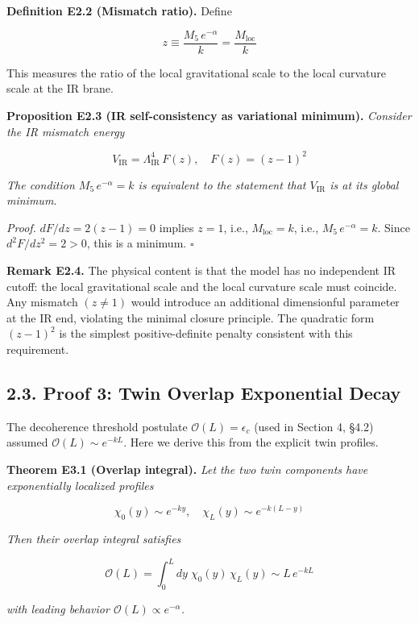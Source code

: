 \documentclass[
  11pt,
]{article}
\begin{document}
\textbf{Definition E2.2 (Mismatch ratio).} Define

\[z \equiv \frac{M_5\,e^{-\alpha}}{k} = \frac{M_{\text{loc}}}{k} \tag{66}\]

This measures the ratio of the local gravitational scale to the local
curvature scale at the IR brane.

\textbf{Proposition E2.3 (IR self-consistency as variational minimum).}
\emph{Consider the IR mismatch energy}

\[V_{\text{IR}} = \Lambda_{\text{IR}}^4\,F(z), \quad F(z) = (z - 1)^2 \tag{67}\]

\emph{The condition \(M_5\,e^{-\alpha} = k\) is equivalent to the
statement that \(V_{\text{IR}}\) is at its global minimum.}

\emph{Proof.} \(dF/dz = 2(z-1) = 0\) implies \(z = 1\), i.e.,
\(M_{\text{loc}} = k\), i.e., \(M_5\,e^{-\alpha} = k\). Since
\(d^2F/dz^2 = 2 > 0\), this is a minimum. \(\square\)

\textbf{Remark E2.4.} The physical content is that the model has no
independent IR cutoff: the local gravitational scale and the local
curvature scale must coincide. Any mismatch \((z \neq 1)\) would
introduce an additional dimensionful parameter at the IR end, violating
the minimal closure principle. The quadratic form \((z-1)^2\) is the
simplest positive-definite penalty consistent with this requirement.

\bigskip

\hypertarget{proof-3-twin-overlap-exponential-decay}{%
\subsection{2.3. Proof 3: Twin Overlap Exponential
Decay}\label{proof-3-twin-overlap-exponential-decay}}

The decoherence threshold postulate \(\mathcal{O}(L) = \epsilon_c\)
(used in Section 4, §4.2) assumed \(\mathcal{O}(L) \sim e^{-kL}\). Here
we derive this from the explicit twin profiles.

\textbf{Theorem E3.1 (Overlap integral).} \emph{Let the two twin
components have exponentially localized profiles}

\[\chi_0(y) \sim e^{-ky}, \quad \chi_L(y) \sim e^{-k(L-y)} \tag{68}\]

\emph{Then their overlap integral satisfies}

\[\mathcal{O}(L) = \int_0^L dy\;\chi_0(y)\,\chi_L(y) \sim L\,e^{-kL} \tag{69}\]

\emph{with leading behavior \(\mathcal{O}(L) \propto e^{-\alpha}\).}
\end{document}
